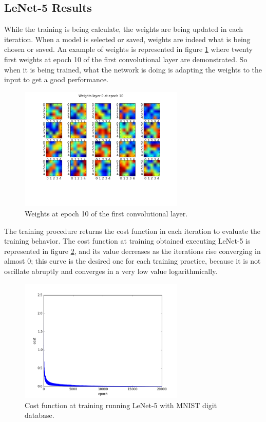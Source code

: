 \subsection{LeNet-5 Results}
While the training is being calculate, the weights are being updated in each iteration. When a  model is selected or saved, weights are indeed what is being chosen or saved. An example of weights is represented in figure \ref{fig:weights_lenet} where twenty first weights at epoch 10 of the first convolutional layer are demonstrated. So when it is being trained, what the network is doing is adapting the weights to the input to get a good performance.\\

\begin{figure}[htb]
\centering
\includegraphics[width=0.7\textwidth]{images/images_lenet/w_layer0_epoch10.png}
\caption{Weights at epoch 10 of the first convolutional layer.} \label{fig:weights_lenet}
\end{figure}

The training procedure returns the cost function in each iteration to evaluate the training behavior. The cost function at training obtained executing LeNet-5 is represented in figure \ref{fig:Lenetcost}, and its value decreases as the iterations rise converging in almost 0; this curve is the desired one for each training practice, because it is not oscillate abruptly and converges in a very low value logarithmically.\\

\begin{figure}[htb]
\centering
\includegraphics[width=0.7\textwidth]{images/images_lenet/cost_lenet.png}
\caption{Cost function at training running LeNet-5 with MNIST digit database.} \label{fig:Lenetcost}
\end{figure}

